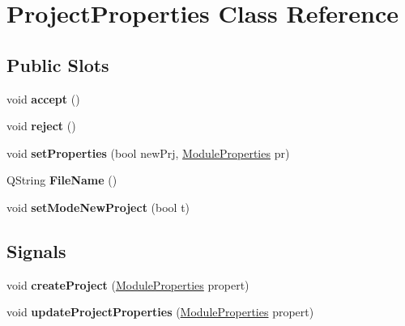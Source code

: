 \hypertarget{classProjectProperties}{
\section{ProjectProperties Class Reference}
\label{classProjectProperties}
}
\subsection*{Public Slots}
\begin{DoxyCompactItemize}
\item 
\hypertarget{classProjectProperties_af8df0f53384a4b33bfdf009ef715ac98}{
void {\bfseries accept} ()}
\label{classProjectProperties_af8df0f53384a4b33bfdf009ef715ac98}

\item 
\hypertarget{classProjectProperties_a5064cedb2e81f7497b4af67967fc596c}{
void {\bfseries reject} ()}
\label{classProjectProperties_a5064cedb2e81f7497b4af67967fc596c}

\item 
\hypertarget{classProjectProperties_ac6a9193ae42d43722e1be8d422e95010}{
void {\bfseries setProperties} (bool newPrj, \hyperlink{structStructModuleProperties}{ModuleProperties} pr)}
\label{classProjectProperties_ac6a9193ae42d43722e1be8d422e95010}

\item 
\hypertarget{classProjectProperties_a8fcb2a6ab4177ff27043c0232a8ad25d}{
QString {\bfseries FileName} ()}
\label{classProjectProperties_a8fcb2a6ab4177ff27043c0232a8ad25d}

\item 
\hypertarget{classProjectProperties_a58ad2a282baec65803ebc4bb93db3ca8}{
void {\bfseries setModeNewProject} (bool t)}
\label{classProjectProperties_a58ad2a282baec65803ebc4bb93db3ca8}

\end{DoxyCompactItemize}
\subsection*{Signals}
\begin{DoxyCompactItemize}
\item 
\hypertarget{classProjectProperties_a71d74c65ce1dd90876fc3a70b2df8099}{
void {\bfseries createProject} (\hyperlink{structStructModuleProperties}{ModuleProperties} propert)}
\label{classProjectProperties_a71d74c65ce1dd90876fc3a70b2df8099}

\item 
\hypertarget{classProjectProperties_ae876b92c7508b086fda5fee90b8e32f4}{
void {\bfseries updateProjectProperties} (\hyperlink{structStructModuleProperties}{ModuleProperties} propert)}
\label{classProjectProperties_ae876b92c7508b086fda5fee90b8e32f4}

\end{DoxyCompactItemize}
